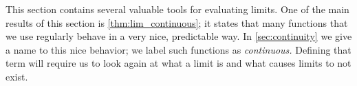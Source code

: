 This section contains several valuable tools for evaluating limits. One of the main results of this section is \autoref{thm:lim_continuous}; it states that many functions that we use regularly behave in a very nice, predictable way. In \autoref{sec:continuity} we give a name to this nice behavior; we label such functions as \emph{continuous.} Defining that term will require us to look again at what a limit is and what causes limits to not exist.

